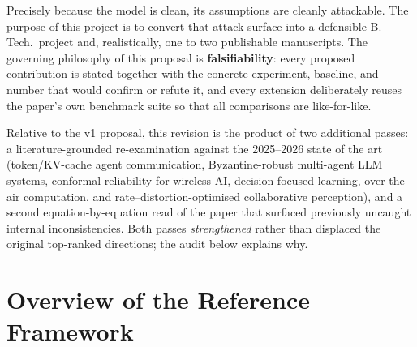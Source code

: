 \documentclass[11pt,a4paper]{article}
\begin{document}
Precisely because the model is clean, its assumptions are cleanly attackable. The purpose of this project is to convert that attack surface into a defensible B.\,Tech.\ project and, realistically, one to two publishable manuscripts. The governing philosophy of this proposal is \textbf{falsifiability}: every proposed contribution is stated together with the concrete experiment, baseline, and number that would confirm or refute it, and every extension deliberately reuses the paper's own benchmark suite so that all comparisons are like-for-like.

Relative to the v1 proposal, this revision is the product of two additional passes: a literature-grounded re-examination against the 2025--2026 state of the art (token/KV-cache agent communication, Byzantine-robust multi-agent LLM systems, conformal reliability for wireless AI, decision-focused learning, over-the-air computation, and rate--distortion-optimised collaborative perception), and a second equation-by-equation read of the paper that surfaced previously uncaught internal inconsistencies. Both passes \emph{strengthened} rather than displaced the original top-ranked directions; the audit below explains why.

\section{Overview of the Reference Framework}
\label{sec:framework}
\end{document}
